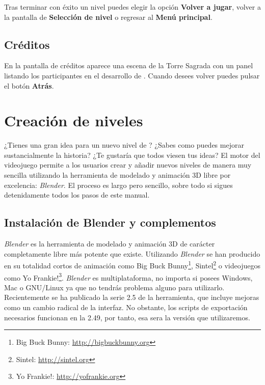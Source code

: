 \documentclass[a4paper,11pt]{article}
\begin{document}
Tras terminar con éxito un nivel puedes elegir la opción \textbf{Volver a jugar},
volver a la pantalla de \textbf{Selección de nivel} o regresar al \textbf{Menú principal}.

\subsection{Créditos}

En la pantalla de créditos aparece una escena de la Torre Sagrada con
un panel listando los participantes en el desarrollo de \juego. Cuando
desees volver puedes pulsar el botón \textbf{Atrás}.



\section{Creación de niveles}

¿Tienes una gran idea para un nuevo nivel de \juego? ¿Sabes como puedes
mejorar sustancialmente la historia? ¿Te gustaría que todos viesen tus ideas?
El motor del videojuego permite a los usuarios crear y añadir nuevos niveles
de manera muy sencilla utilizando la herramienta de modelado y animación
3D libre por excelencia: \textit{Blender}. El proceso es largo pero sencillo,
sobre todo si sigues detenidamente todos los pasos de este manual.

\subsection{Instalación de Blender y complementos}

\textit{Blender} es la herramienta de modelado y animación 3D de carácter
completamente libre más potente que existe. Utilizando \textit{Blender}
se han producido en su totalidad cortos de animación como
Big Buck Bunny\footnote{Big Buck Bunny: \url{http://bigbuckbunny.org}},
Sintel\footnote{Sintel: \url{http://sintel.org}} o videojuegos como
Yo Frankie!\footnote{Yo Frankie!: \url{http://yofrankie.org}}. \textit{Blender} es
multiplataforma, no importa si posees Windows, Mac o GNU/Linux ya que no
tendrás problema alguno para utilizarlo. Recientemente se ha publicado la
serie 2.5 de la herramienta, que incluye mejoras como un cambio radical de
la interfaz. No obstante, los scripts de exportación necesarios funcionan
en la 2.49, por tanto, esa sera la versión que utilizaremos.\\
\end{document}
